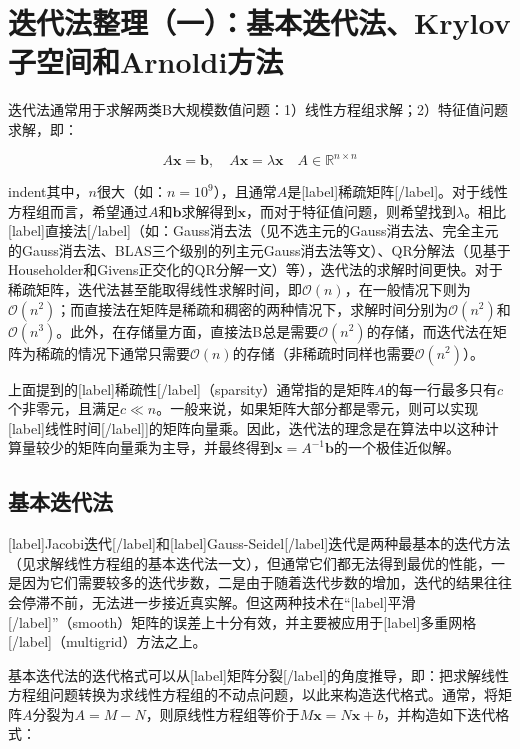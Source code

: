 \documentclass[UTF8,nofonts]{ctexart}
\begin{document}
\section*{迭代法整理（一）：基本迭代法、Krylov子空间和Arnoldi方法}


迭代法通常用于求解两类B大规模数值问题：1）线性方程组求解；2）特征值问题求解，即：

\[
A\boldsymbol{x}=\boldsymbol{b},\quad
A\boldsymbol{x}=\lambda\boldsymbol{x}\quad
A\in\mathbb{R}^{n \times n}
\]

indent其中，$n$很大（如：$n=10^9$），且通常$A$是[label]稀疏矩阵[/label]。对于线性方程组而言，希望通过$A$和$\boldsymbol{b}$求解得到$\boldsymbol{x}$，而对于特征值问题，则希望找到$\lambda$。相比[label]直接法[/label]（如：Gauss消去法（见不选主元的Gauss消去法、完全主元的Gauss消去法、BLAS三个级别的列主元Gauss消去法等文）、QR分解法（见基于Householder和Givens正交化的QR分解一文）等），迭代法的求解时间更快。对于稀疏矩阵，迭代法甚至能取得线性求解时间，即$\mathcal{O}(n)$，在一般情况下则为$\mathcal{O}(n^2)$；而直接法在矩阵是稀疏和稠密的两种情况下，求解时间分别为$\mathcal{O}(n^2)$和$\mathcal{O}(n^3)$。此外，在存储量方面，直接法B总是需要$\mathcal{O}(n^2)$的存储，而迭代法在矩阵为稀疏的情况下通常只需要$\mathcal{O}(n)$的存储（非稀疏时同样也需要$\mathcal{O}(n^2)$）。

上面提到的[label]稀疏性[/label]（sparsity）通常指的是矩阵$A$的每一行最多只有$c$个非零元，且满足$c \ll n$。一般来说，如果矩阵大部分都是零元，则可以实现[label]线性时间[/label]]的矩阵向量乘。因此，迭代法的理念是在算法中以这种计算量较少的矩阵向量乘为主导，并最终得到$\boldsymbol{x}=A^{-1}\boldsymbol{b}$的一个极佳近似解。

\subsection*{基本迭代法}

[label]Jacobi迭代[/label]和[label]Gauss-Seidel[/label]迭代是两种最基本的迭代方法（见求解线性方程组的基本迭代法一文），但通常它们都无法得到最优的性能，一是因为它们需要较多的迭代步数，二是由于随着迭代步数的增加，迭代的结果往往会停滞不前，无法进一步接近真实解。但这两种技术在“[label]平滑[/label]”（smooth）矩阵的误差上十分有效，并主要被应用于[label]多重网格[/label]（multigrid）方法之上。

基本迭代法的迭代格式可以从[label]矩阵分裂[/label]的角度推导，即：把求解线性方程组问题转换为求线性方程组的不动点问题，以此来构造迭代格式。通常，将矩阵$A$分裂为$A=M-N$，则原线性方程组等价于$M\boldsymbol{x}=N\boldsymbol{x}+b$，并构造如下迭代格式：
\end{document}
